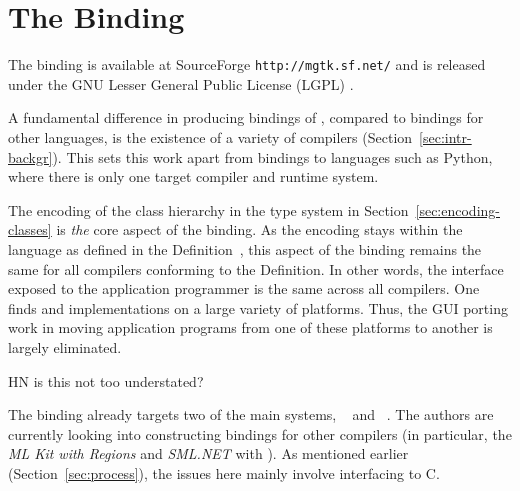 \documentclass[finalversion]{usetex-v1}
\begin{document}





\section{The \mgtk Binding}
\label{sec:mgtk-binding}

The \mgtk binding is available at SourceForge \texttt{http://mgtk.sf.net/}
and is released under the GNU Lesser General Public License
(LGPL) \cite{LGPL:1999}.

A fundamental difference in producing \sml bindings of \gtk, compared
to bindings for other languages, is the existence of a variety of
compilers (Section~\ref{sec:intr-backgr}). This sets
this work apart from bindings to languages such as Python, where
there is only one target compiler and runtime system. 

The encoding of the \gtk class hierarchy in the \sml type system in
Section~\ref{sec:encoding-classes} is \emph{the} core aspect of the
binding. As the encoding stays within the language as defined in the
Definition~\cite{Milner:1997:Definition}, this aspect of the binding
remains the same for all \sml compilers conforming to the Definition.
In other words, the interface exposed to the application programmer is
the same across all compilers.
%
One finds \sml and \gtk implementations on a large variety of
platforms. Thus, the GUI porting work in moving application programs from one of these
platforms to another is largely eliminated. \begin{ednote}{HN} is this not too understated? \end{ednote}

The \mgtk binding already targets two of the main \sml systems,
\mosml~\cite{Mosml-webpage:2003} and \mlton~\cite{MLton-webpage:2003}.
The authors are currently looking into constructing
bindings for other \sml compilers (in particular, the \emph{ML Kit
  with Regions} \cite{MLKit-webpage:2003} and \emph{SML.NET}
\cite{SML.NET-webpage:2003} with \gtksharp). As mentioned earlier
(Section~\ref{sec:process}), the issues here  mainly involve interfacing
to C.
\end{document}
